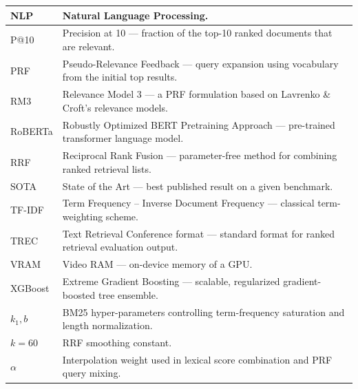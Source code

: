 \begin{longtable}{|p{2.8cm}|p{10.5cm}|}
NLP        & Natural Language Processing. \\\hline
P@10       & Precision at 10 --- fraction of the top-10 ranked documents that are relevant. \\\hline
PRF        & Pseudo-Relevance Feedback --- query expansion using vocabulary from the initial top results. \\\hline
RM3        & Relevance Model 3 --- a PRF formulation based on Lavrenko \& Croft's relevance models. \\\hline
RoBERTa    & Robustly Optimized BERT Pretraining Approach --- pre-trained transformer language model. \\\hline
RRF        & Reciprocal Rank Fusion --- parameter-free method for combining ranked retrieval lists. \\\hline
SOTA       & State of the Art --- best published result on a given benchmark. \\\hline
TF-IDF     & Term Frequency -- Inverse Document Frequency --- classical term-weighting scheme. \\\hline
TREC       & Text Retrieval Conference format --- standard format for ranked retrieval evaluation output. \\\hline
VRAM       & Video RAM --- on-device memory of a GPU. \\\hline
XGBoost    & Extreme Gradient Boosting --- scalable, regularized gradient-boosted tree ensemble. \\\hline
$k_1, b$   & BM25 hyper-parameters controlling term-frequency saturation and length normalization. \\\hline
$k=60$     & RRF smoothing constant. \\\hline
$\alpha$   & Interpolation weight used in lexical score combination and PRF query mixing. \\\hline

\end{longtable}
